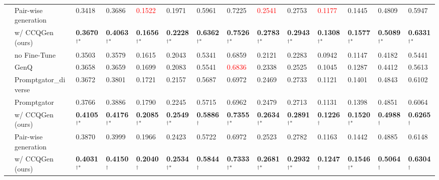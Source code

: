 \begin{table*}[t]
{\begin{tabular}{cl llllll  llllll}
 & Pair-wise generation & 0.3418 & 0.3686 & \textcolor{red}{0.1522} & 0.1971 & 0.5961 & 0.7225 & \textcolor{red}{0.2541} & 0.2753 & \textcolor{red}{0.1177} & 0.1445 & 0.4809 & 0.5947 \\
 & w/ CCQGen (ours) & \textbf{0.3670}$^{\dagger}$$^*$ & \textbf{0.4063}$^{\dagger}$$^*$ & \textbf{0.1656}$^{\dagger}$$^*$ & \textbf{0.2228}$^{\dagger}$$^*$ & \textbf{0.6362}$^{\dagger}$$^*$ & \textbf{0.7526}$^{\dagger}$$^*$ & \textbf{0.2783}$^{\dagger}$$^*$ & \textbf{0.2943}$^{\dagger}$$^*$ & \textbf{0.1308}$^{\dagger}$$^*$ & \textbf{0.1577}$^{\dagger}$$^*$ & \textbf{0.5089}$^{\dagger}$$^*$ & \textbf{0.6331}$^{\dagger}$$^*$ \\ \midrule
\parbox[t]{2mm}{} & no Fine-Tune & 0.3503 & 0.3579 & 0.1615 & 0.2043 & 0.5341 & 0.6859 & 0.2121 & 0.2283 & 0.0942 & 0.1147 & 0.4182 & 0.5441 \\
 & GenQ & 0.3658 & 0.3659 & 0.1699 & 0.2083 & 0.5541 & \textcolor{red}{0.6836} & 0.2338 & 0.2525 & 0.1045 & 0.1287 & 0.4412 & 0.5613 \\
 & Promptgator\_diverse & 0.3672 & 0.3801 & 0.1721 & 0.2157 & 0.5687 & 0.6972 & 0.2469 & 0.2733 & 0.1121 & 0.1401 & 0.4843 & 0.6102 \\ \cmidrule(lr){2-14}
 & Promptgator & 0.3766 & 0.3886 & 0.1790 & 0.2245 & 0.5715 & 0.6962 & 0.2479 & 0.2713 & 0.1131 & 0.1398 & 0.4851 & 0.6064 \\
 & w/ CCQGen (ours) & \textbf{0.4105}$^{\dagger}$$^*$ & \textbf{0.4176}$^{\dagger}$$^*$ & \textbf{0.2085}$^{\dagger}$$^*$ & \textbf{0.2549}$^{\dagger}$$^*$ & \textbf{0.5886}$^{\dagger}$ & \textbf{0.7355}$^{\dagger}$$^*$ & \textbf{0.2634}$^{\dagger}$$^*$ & \textbf{0.2891}$^{\dagger}$$^*$ & \textbf{0.1226}$^{\dagger}$ & \textbf{0.1520}$^{\dagger}$$^*$ & \textbf{0.4988}$^{\dagger}$ & \textbf{0.6265}$^{\dagger}$ \\ \cmidrule(lr){2-14}
 & Pair-wise generation & 0.3870 & 0.3999 & 0.1966 & 0.2423 & 0.5722 & 0.6972 & 0.2523 & 0.2782 & 0.1163 & 0.1442 & 0.4885 & 0.6148 \\
 & w/ CCQGen (ours) & \textbf{0.4031}$^{\dagger}$$^*$ & \textbf{0.4150}$^{\dagger}$ & \textbf{0.2040}$^{\dagger}$ & \textbf{0.2534}$^{\dagger}$$^*$ & \textbf{0.5844}$^{\dagger}$ & \textbf{0.7333}$^{\dagger}$$^*$ & \textbf{0.2681}$^{\dagger}$$^*$ & \textbf{0.2932}$^{\dagger}$$^*$ & \textbf{0.1247}$^{\dagger}$ & \textbf{0.1546}$^{\dagger}$$^*$ & \textbf{0.5064}$^{\dagger}$ & \textbf{0.6304}$^{\dagger}$\\ \bottomrule
\end{tabular}}
\label{tab:main}
\vspace{-0.3cm}
\end{table*}

